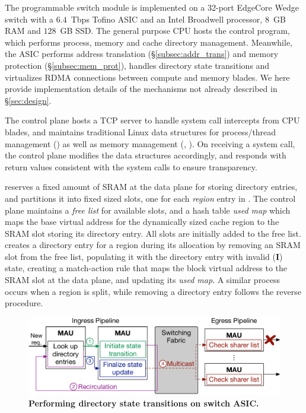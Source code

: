 The \mind programmable switch module is implemented on a 32-port EdgeCore Wedge switch with a $6.4$~Tbps Tofino ASIC and an Intel Broadwell processor, $8$~GB RAM and $128$~GB SSD. The general purpose CPU hosts the \mind control program, which performs process, memory and cache directory management. Meanwhile, the ASIC performs address translation (\S\ref{subsec:addr_trans}) and memory protection (\S\ref{subsec:mem_prot}), handles directory state transitions and virtualizes RDMA connections between compute and memory blades. We here provide implementation details of the mechanisms not already described in \S\ref{sec:design}.

 The control plane hosts a TCP server to handle system call intercepts from CPU blades, and maintains traditional Linux data structures for process/thread management () as well as memory management (, ). On receiving a system call, the control plane modifies the data structures accordingly, and responds with return values consistent with the system calls to ensure transparency.

 \mind reserves a fixed amount of SRAM at the data plane for storing directory entries, and partitions it into fixed sized slots, one for each \textit{region} entry in \mind. The control plane maintains a \textit{free list} for available slots, and a hash table \textit{used map} which maps the base virtual address for the dynamically sized cache region to the SRAM slot storing its directory entry. All slots are initially added to the free list. \mind creates a directory entry for a region during its allocation by removing an SRAM slot from the free list, populating it with the directory entry with invalid (\textbf{I}) state, creating a match-action rule that maps the block virtual address to the SRAM slot at the data plane, and updating its \textit{used map}. A similar process occurs when a region is split, while removing a directory entry follows the reverse procedure.

\begin{figure}[t]
  \centering
  \includegraphics[width=0.97\columnwidth]{fig/mind/cc.pdf}
  \vspace{-0.7em}
  \caption{\textbf{Performing directory state transitions on switch ASIC.}}
  \vspace{-0.5em}
  \label{fig:cc_example}
\end{figure}

